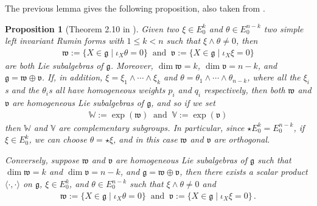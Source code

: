 \documentclass[dvipsnames]{amsart}
\newtheorem{proposition}[theorem]{Proposition}
\theoremstyle{definition}
\theoremstyle{definition}
\numberwithin{equation}{section}
\newcommand{\W}{\mathbb{W}}
\newcommand{\V}{\mathbb{V}}
\begin{document}
The previous lemma gives the following proposition, also taken from \cite{FranchiSerapioni}.
\begin{proposition}[Theorem 2.10 in \cite{FranchiSerapioni}]\label{prop: complementary subgroups vs Rumin forms}
    Given two $\xi\in E_0^k$ and $\theta\in E_0^{n-k}$ two simple left invariant Rumin forms with $1\le k<n$ such that $\xi\wedge\theta\neq 0$, then
    \begin{align*}
        \mathfrak{w}:=\{X\in\mathfrak{g}\mid \iota_X\theta=0\}\ \text{ and }\ \mathfrak{v}:=\{X\in\mathfrak{g}\mid \iota_X\xi=0\}
    \end{align*}
    are both Lie subalgebras of $\mathfrak{g}$. Moreover, $\operatorname{dim}\mathfrak{w}=k$, $\operatorname{dim}\mathfrak{v}=n-k$, and $\mathfrak{g}=\mathfrak{w}\oplus\mathfrak{v}$. If, in addition, $\xi=\xi_1\wedge\cdots\wedge\xi_k$ and $\theta=\theta_1\wedge\cdots\wedge\theta_{n-k}$, where all the $\xi_i$s and the $\theta_i$s all have homogeneous weights $p_i$ and $q_i$ respectively, then both $\mathfrak{w}$ and $\mathfrak{v}$ are homogeneous Lie subalgebras of $\mathfrak{g}$, and so if we set
    \begin{align*}
        \W:=\exp(\mathfrak{w})\ \text{ and }\ \V:=\exp(\mathfrak{v})
    \end{align*}
    then $\W$ and $\V$ are complementary subgroups. In particular, since $\star E_0^k=E_0^{n-k}$, if $\xi\in E_0^k$, we can choose $\theta=\star\xi$, and in this case $\mathfrak{w}$ and $\mathfrak{v}$ are orthogonal.

    Conversely, suppose $\mathfrak{w}$ and $\mathfrak{v}$ are homogeneous Lie subalgebras of $\mathfrak{g}$ such that $\operatorname{dim}\mathfrak{w}=k$ and $\operatorname{dim}\mathfrak{v}=n-k$, and $\mathfrak{g}=\mathfrak{w}\oplus\mathfrak{v}$, then there exists a scalar product $\langle\cdot,\cdot\rangle$ on $\mathfrak{g}$, $\xi\in E_0^k$, and $\theta\in E_0^{n-k}$ such that $\xi\wedge\theta\neq 0$ and
    \begin{align*}
        \mathfrak{w}:=\{X\in\mathfrak
        g\mid \iota_X\theta=0\}\ \text{ and }\ \mathfrak{v}:=\{X\in\mathfrak{g}\mid \iota_X\xi=0\}\,.
    \end{align*}
\end{proposition}
\end{document}
